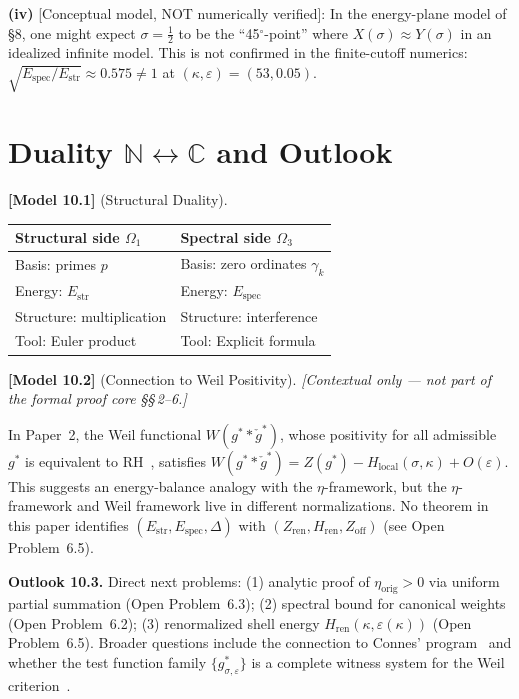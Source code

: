 \documentclass[11pt]{article}
\newcommand{\Estr}{E_{\mathrm{str}}}
\newcommand{\Espec}{E_{\mathrm{spec}}}
\newcommand{\etaorig}{\eta_{\mathrm{orig}}}
\newcommand{\Hlocal}{H_{\mathrm{local}}}
\newcommand{\Hren}{H_{\mathrm{ren}}}
\begin{document}
\textbf{(iv)} [Conceptual model, NOT numerically verified]: In the energy-plane
model of \S8, one might expect $\sigma=\tfrac12$ to be the
``45${}^\circ$-point'' where $X(\sigma)\approx Y(\sigma)$ in an idealized
infinite model. This is not confirmed in the finite-cutoff numerics:
$\sqrt{\Espec/\Estr}\approx 0.575\neq 1$ at $(\kappa,\varepsilon)=(53,0.05)$.

\section{Duality $\mathbb{N}\leftrightarrow\mathbb{C}$ and Outlook}

\textbf{[Model 10.1]} (Structural Duality).
\begin{center}
\begin{tabular}{ll}
\toprule
\textbf{Structural side} $\Omega_1$ & \textbf{Spectral side} $\Omega_3$ \\
\midrule
Basis: primes $p$ & Basis: zero ordinates $\gamma_k$ \\
Energy: $\Estr$ & Energy: $\Espec$ \\
Structure: multiplication & Structure: interference \\
Tool: Euler product & Tool: Explicit formula \\
\bottomrule
\end{tabular}
\end{center}

\textbf{[Model 10.2]} (Connection to Weil Positivity).
\emph{[Contextual only --- not part of the formal proof core \S\S\,2--6.]}

In Paper~2, the Weil functional $W(g^*\ast\check{g}^*)$, whose positivity for
all admissible $g^*$ is equivalent to RH~\cite{Wei52,Lag99}, satisfies
$W(g^*\ast\check{g}^*)=Z(g^*)-\Hlocal(\sigma,\kappa)+O(\varepsilon)$.
This suggests an energy-balance analogy with the $\eta$-framework, but the
$\eta$-framework and Weil framework live in different normalizations.
No theorem in this paper identifies $(\Estr,\Espec,\Delta)$ with
$(Z_{\mathrm{ren}},\Hren,Z_{\mathrm{off}})$ (see Open Problem~6.5).

\textbf{Outlook 10.3.}
Direct next problems: (1) analytic proof of $\etaorig>0$ via uniform partial
summation (Open Problem~6.3); (2) spectral bound for canonical weights (Open
Problem~6.2); (3) renormalized shell energy $\Hren(\kappa,\varepsilon(\kappa))$
(Open Problem~6.5). Broader questions include the connection to Connes'
program~\cite{Con99} and whether the test function family $\{g^*_{\sigma,\varepsilon}\}$
is a complete witness system for the Weil criterion~\cite{Lag99}.
\end{document}
